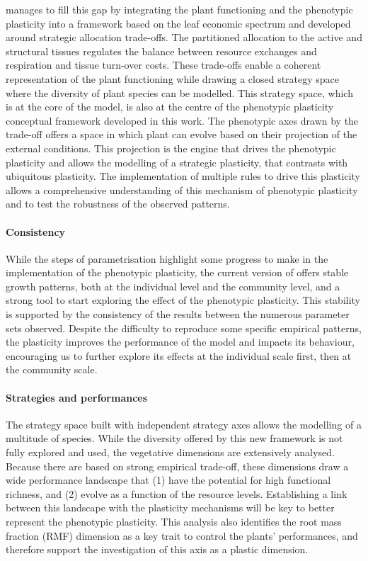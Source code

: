 \model manages to fill this gap by integrating the plant functioning and the phenotypic plasticity into a framework based on the leaf economic spectrum and developed around strategic allocation trade-offs. The partitioned allocation to the active and structural tissues regulates the balance between resource exchanges and respiration and tissue turn-over costs. These trade-offs enable a coherent representation of the plant functioning while drawing a closed strategy space where the diversity of plant species can be modelled. This strategy space, which is at the core of the model, is also at the centre of the phenotypic plasticity conceptual framework developed in this work. The phenotypic axes drawn by the trade-off offers a space in which plant can evolve based on their projection of the external conditions. This projection is the engine that drives the phenotypic plasticity and allows the modelling of a strategic plasticity, that contrasts with ubiquitous plasticity. The implementation of multiple rules to drive this plasticity allows a comprehensive understanding of this mechanism of phenotypic plasticity and to test the robustness of the observed patterns.


\paragraph{Consistency}

While the steps of parametrisation highlight some progress to make in the implementation of the phenotypic plasticity, the current version of \model offers stable growth patterns, both at the individual level and the community level, and a strong tool to start exploring the effect of the phenotypic plasticity. This stability is supported by the consistency of the results between the numerous parameter sets observed. Despite the difficulty to reproduce some specific empirical patterns, the plasticity improves the performance of the model and impacts its behaviour, encouraging us to further explore its effects at the individual scale first, then at the community scale.

\paragraph{Strategies and performances}

The strategy space built with independent strategy axes allows the modelling of a multitude of species. While the diversity offered by this new framework is not fully explored and used, the vegetative dimensions are extensively analysed. Because there are based on strong empirical trade-off, these dimensions draw a wide performance landscape that (1) have the potential for high functional richness, and (2) evolve as a function of the resource levels. Establishing a link between this landscape with the plasticity mechanisms will be key to better represent the phenotypic plasticity. This analysis also identifies the root mass fraction (RMF) dimension as a key trait to control the plants' performances, and therefore support the investigation of this axis as a plastic dimension.


